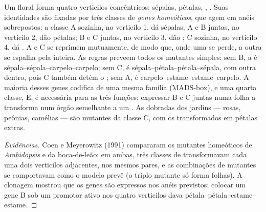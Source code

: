 \begin{proposition}\label{prop:b2:plant-flowering:abc}
Um  floral forma quatro verticilos concêntricos: sépalas,
pétalas, , . Suas identidades são fixadas por três
classes de \emph{genes homeóticos}, que agem em anéis sobrepostos: a
classe A sozinha, no verticilo 1, dá sépalas; A e B juntas, no
verticilo 2, dão pétalas; B e C juntas, no verticilo 3, dão ; C
sozinha, no verticilo 4, dá . A e C se reprimem mutuamente, de
modo que, onde uma se perde, a outra se espalha pela  inteira. As
regras preveem todos os mutantes simples: sem B, a  é
sépala--sépala--carpelo--carpelo; sem C, é
sépala--pétala--pétala--sépala, com outra  dentro, pois C também
detém o ; sem A, é carpelo--estame--estame--carpelo. A maioria
desses genes codifica  de uma mesma família
(MADS-box), e uma quarta classe, E, é necessária para as três funções;
expressar B e C juntas numa folha a transforma num órgão semelhante a
um . As  dobradas dos jardins --- rosas, peônias, camélias
--- são mutantes da classe C, com os  transformados em pétalas
extras.
\end{proposition}
\begin{proof}[Evidências]
Coen e Meyerowitz (1991) compararam os mutantes homeóticos de
\emph{Arabidopsis} e da boca-de-leão: em ambas, três classes de 
transformavam cada uma dois verticilos adjacentes, nos mesmos pares, e
as combinações de mutantes se comportavam como o modelo prevê (o
triplo mutante só forma folhas). A clonagem mostrou que os genes são
 expressos nos anéis previstos; colocar um gene B
sob um promotor ativo nos quatro verticilos dava
pétala--pétala--estame--estame.
\end{proof}

